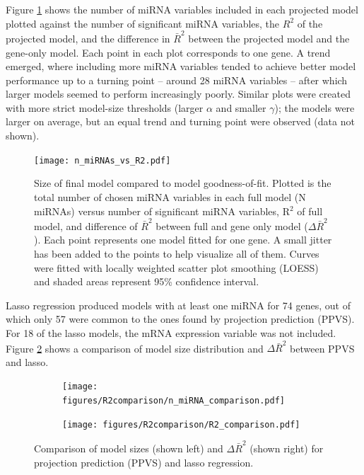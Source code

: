 Figure \ref{fig:n-miRNAs-vs-R2} shows the number of miRNA variables included in
each projected model plotted against the number of significant miRNA
variables, the $R^2$ of the projected model, and the difference in $\bar{R}^2$
between the projected model and the gene-only model. Each point in each plot
corresponds to one gene. A trend emerged, where including more
miRNA variables tended to achieve better model performance up to a turning point --
around 28 miRNA variables -- after which larger models seemed to perform
increasingly poorly. Similar plots were created with more strict model-size
thresholds (larger $\alpha$ and smaller $\gamma$); the models were larger on
average, but an equal trend and turning point were observed (data not shown).

\begin{figure}[!h]
  \centering
  \texttt{[image: n\_miRNAs\_vs\_R2.pdf]}
  \caption{Size of final model compared to model goodness-of-fit. Plotted is
  the total number of chosen miRNA variables in each full model (N miRNAs)
  versus number of significant miRNA variables, R$^2$ of full model, and
  difference of $\bar{R}^2$ between full and gene only model
  ($\Delta\bar{R}^2$). Each point represents one model fitted for one gene. A
  small jitter has been added to the points to help visualize all of them.
  Curves were fitted with locally weighted scatter plot smoothing (LOESS) and
  shaded areas represent 95\% confidence interval.}
  \label{fig:n-miRNAs-vs-R2}
\end{figure}

Lasso regression produced models with at least one miRNA for 74 genes, out of
which only 57 were common to the ones found by projection prediction (PPVS).
For 18 of the lasso models, the mRNA expression variable was not included.
Figure \ref{fig:model-size} shows a comparison of model size distribution
and $\Delta\bar{R}^2$ between PPVS and lasso.

\begin{figure}[!h]
  \centering
  \begin{subfigure}{.45\textwidth}
    \texttt{[image: figures/R2comparison/n\_miRNA\_comparison.pdf]}
  \end{subfigure}
  \begin{subfigure}{.45\textwidth}
    \texttt{[image: figures/R2comparison/R2\_comparison.pdf]}
  \end{subfigure}

  \caption{Comparison of model sizes (shown left) and $\Delta\bar{R}^2$ (shown right) for
      projection prediction (PPVS) and lasso regression.}
  \label{fig:model-size}
\end{figure}




